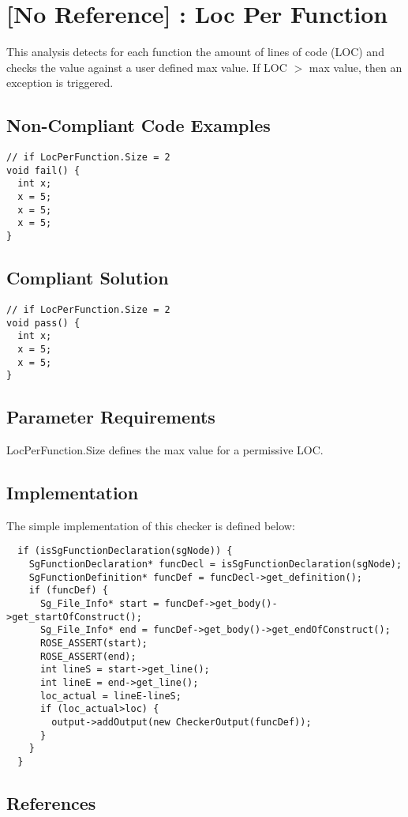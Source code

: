 \section{[No Reference] : Loc Per Function}

This analysis detects for each function the amount of lines of code (LOC) 
and checks the value against a user defined max value.
If LOC $>$ max value, then an exception is triggered.

\subsection{Non-Compliant Code Examples}
\begin{verbatim}
// if LocPerFunction.Size = 2
void fail() {
  int x;
  x = 5;
  x = 5;
  x = 5;
}
\end{verbatim}


\subsection{Compliant Solution}
\begin{verbatim}
// if LocPerFunction.Size = 2
void pass() {
  int x;
  x = 5;
  x = 5;
}
\end{verbatim}

\subsection{Parameter Requirements}

LocPerFunction.Size defines the max value for a permissive LOC.

\subsection{Implementation}

The simple implementation of this checker is defined below:

\begin{verbatim}
  if (isSgFunctionDeclaration(sgNode)) {
    SgFunctionDeclaration* funcDecl = isSgFunctionDeclaration(sgNode);
    SgFunctionDefinition* funcDef = funcDecl->get_definition();
    if (funcDef) {
      Sg_File_Info* start = funcDef->get_body()->get_startOfConstruct();
      Sg_File_Info* end = funcDef->get_body()->get_endOfConstruct();
      ROSE_ASSERT(start);
      ROSE_ASSERT(end);
      int lineS = start->get_line();
      int lineE = end->get_line();
      loc_actual = lineE-lineS;
      if (loc_actual>loc) {
        output->addOutput(new CheckerOutput(funcDef));
      }
    }
  }
\end{verbatim}   

\subsection{References}

